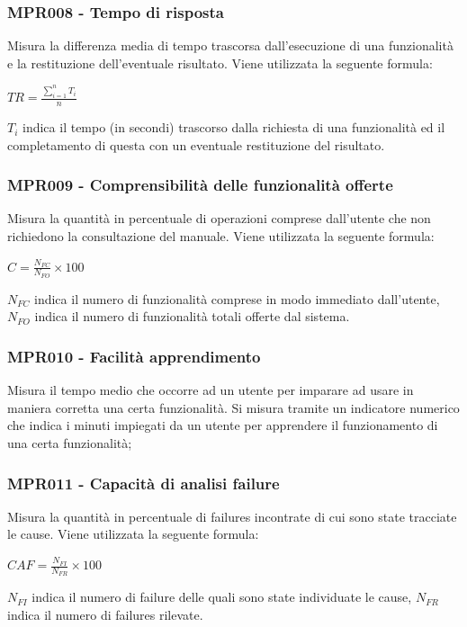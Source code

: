 \subsubsection{MPR008 - Tempo di risposta}
Misura la differenza media di tempo trascorsa dall’esecuzione di una funzionalità e la restituzione
dell’eventuale risultato. Viene utilizzata la seguente formula:
\begin{center}{$TR=\frac{\sum\limits_{i=1}^n {T_i }}{n}$}\end{center}
${T_i}$ indica il tempo (in secondi) trascorso dalla richiesta di una funzionalità ed il completamento di questa con un eventuale restituzione del risultato.\\

\subsubsection{MPR009 - Comprensibilità  delle funzionalità offerte}
Misura la quantità in percentuale di operazioni comprese dall’utente che non richiedono la
consultazione del manuale. Viene utilizzata la seguente formula:
\begin{center}{$C=\frac{N_{FC}}{N_{FO}}\times 100$}\end{center}
${N_{FC}}$ indica il numero di funzionalità comprese in modo immediato dall'utente, ${N_{FO}}$ indica il numero di funzionalità totali offerte dal sistema.

\subsubsection{MPR010 - Facilità apprendimento}
Misura il tempo medio che occorre ad un utente per imparare ad usare in maniera corretta
una certa funzionalità. Si misura tramite un indicatore numerico che indica i minuti
impiegati da un utente per apprendere il funzionamento di una certa funzionalità;

\subsubsection{MPR011 - Capacità di analisi failure}
Misura la quantità in percentuale di failures incontrate di cui sono state tracciate le cause. Viene
utilizzata la seguente formula:
\begin{center}{$CAF=\frac{N_{FI}}{N_{FR}}\times 100 $}\end{center}
${N_{FI}}$ indica il numero di failure delle quali sono state individuate le cause, ${N_{FR}}$ indica il numero di failures rilevate.

